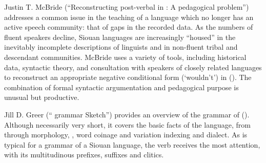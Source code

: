\begin{refsection}
Justin T. McBride (``Reconstructing post-verbal  in : A pedagogical problem'') addresses a common issue in the teaching of a language which no longer has an active speech community: that of gaps in the recorded data. As the numbers of fluent speakers decline, Siouan languages are increasingly ``housed'' in the inevitably incomplete descriptions of linguists and in non-fluent tribal and descendant communities. McBride uses a variety of tools, including historical data, syntactic theory, and consultation with speakers of closely related languages to reconstruct an appropriate negative conditional form (`wouldn't') in  (). The combination of formal syntactic argumentation and pedagogical purpose is unusual but productive. 

Jill D. Greer (`` grammar Sketch'') provides an overview of the grammar of  (). Although necessarily very short, it covers the basic facts of the language, from  through morphology, , word coinage and variation indexing  and dialect. As is typical for a grammar of a Siouan language, the verb receives the most attention, with its multitudinous prefixes, suffixes and clitics. 
 

\printbibliography[heading=subbibliography,notkeyword=this]
 
\end{refsection}

